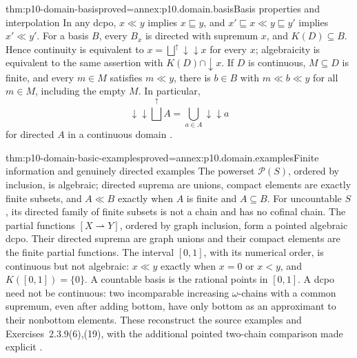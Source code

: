 \begin{hbtheorem}{thm:p10-domain-basis}{proved=annex:p10.domain.basis}{Basis properties and interpolation}
In any dcpo, \(x\ll y\) implies \(x\sqsubseteq y\), and
\(x'\sqsubseteq x\ll y\sqsubseteq y'\) implies \(x'\ll y'\).
For a basis \(B\), every \(B_x\) is directed with supremum \(x\),
and \(K(D)\subseteq B\). Hence continuity is equivalent to
\(x=\bigsqcup^{\uparrow}\mathord{\downarrow\!\downarrow}x\) for
every \(x\); algebraicity is equivalent to the same assertion with
\(K(D)\cap\downarrow x\).
If \(D\) is continuous, \(M\subseteq D\) is finite, and every
\(m\in M\) satisfies \(m\ll y\), there is \(b\in B\) with
\(m\ll b\ll y\) for all \(m\in M\), including the empty \(M\).
In particular,
\[
 \mathord{\downarrow\!\downarrow}\bigsqcup^{\uparrow}A
       =\bigcup_{a\in A}\mathord{\downarrow\!\downarrow}a
\]
for directed \(A\) in a continuous domain
\cite[Propositions~2.2.2,2.2.4,2.2.7; Lemma~2.2.15;
Corollary~2.2.16, pp.~18--25]{AbramskyJungCorrectedExpandedDomainTheory}.
\end{hbtheorem}

\begin{hbtheorem}{thm:p10-domain-basic-examples}{proved=annex:p10.domain.examples}{Finite information and genuinely directed examples}
The powerset \(\mathcal P(S)\), ordered by inclusion, is algebraic;
directed suprema are unions, compact elements are exactly finite subsets,
and \(A\ll B\) exactly when \(A\) is finite and \(A\subseteq B\).
For uncountable \(S\), its directed family of finite subsets is not a
chain and has no cofinal chain.
The partial functions \([X\rightharpoonup Y]\), ordered by graph
inclusion, form a pointed algebraic dcpo. Their directed suprema are
graph unions and their compact elements are the finite partial functions.
The interval \([0,1]\), with its numerical order, is continuous but
not algebraic: \(x\ll y\) exactly when \(x=0\) or \(x<y\), and
\(K([0,1])=\{0\}\). A countable basis is the rational points in
\([0,1]\). A dcpo need not be continuous: two incomparable increasing
\(\omega\)-chains with a common supremum, even after adding bottom,
have only bottom as an approximant to their nonbottom elements.
These reconstruct the source examples and Exercises~2.3.9(6),(19),
with the additional pointed two-chain comparison made explicit
\cite[pp.~13,18--21,31--32]{AbramskyJungCorrectedExpandedDomainTheory}.
\end{hbtheorem}

